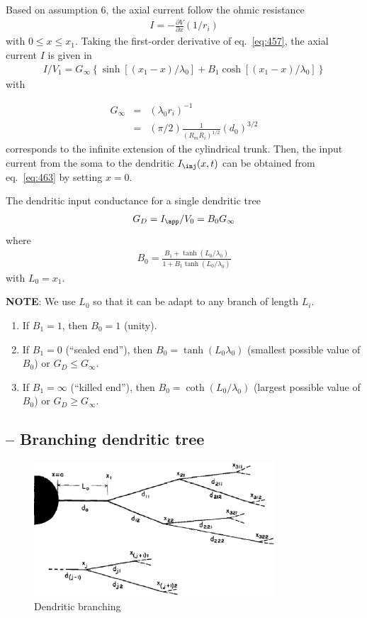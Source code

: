 Based on assumption 6, the axial current follow the ohmic resistance
\begin{eqnarray*}
  I = -\frac{\partial V}{\partial x}(1/r_i)
\end{eqnarray*}
with $0\le x\le x_1$. Taking the first-order derivative of
eq.~\eqref{eq:457}, the axial current $I$ is given in
\begin{eqnarray}
  \label{eq:463}
  I/V_1 = G_\infty \left\{ \sinh [(x_1-x)/\lambda_0] + B_1 \cosh [(x_1-x)/\lambda_0]\right\}
\end{eqnarray}
with

\begin{eqnarray*}
  G_\infty &=& (\lambda_0r_i)^{-1} \\
  &=& (\pi/2)\frac{1}{(R_mR_i)^{1/2}} (d_0)^{3/2}
\end{eqnarray*}
corresponds to the infinite extension of the cylindrical trunk.  Then,
the input current from the soma to the dendritic $I_\inj(x,t) $ can be obtained
from eq.~\eqref{eq:463} by setting $x=0$. 

The dendritic input conductance for a single dendritic tree
\begin{eqnarray}
  \label{eq:464}
  G_D = I_\app /V_0=B_0G_\infty
\end{eqnarray}
where 
\begin{eqnarray*}
  B_0 = \frac{B_1+\tanh(L_0/\lambda_0)}{1+B_1\tanh(L_0/\lambda_0)}
\end{eqnarray*}
with $L_0=x_1$. 

{\bf NOTE}: We use $L_0$ so that it can be adapt to any branch of
length $L_i$.
\begin{enumerate}
\item If $B_1=1$, then $B_0=1$ (unity).
\item If $B_1=0$ (``sealed end''), then $B_0=\tanh(L_0\lambda_0)$
  (smallest possible value of $B_0$) or $G_D\le G_\infty$.
\item If $B_1=\infty$ (``killed end''), then
  $B_0=\coth(L_0/\lambda_0)$ (largest possible value of $B_0$) or
  $G_D\ge G_\infty$.
\end{enumerate}

\subsection{-- Branching dendritic tree}
\label{sec:branch-dendr-tree}



\begin{figure}[hbt]
  \centerline{\includegraphics[height=5cm,
    angle=0]{./images/dendritic_branching.eps}}
\caption{Dendritic branching}
\label{fig:dendritic_branching}
\end{figure}

